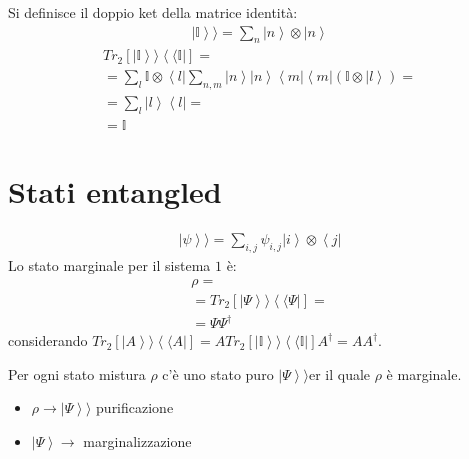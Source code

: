 Si definisce il doppio ket della matrice identità:
\begin{equation}\begin{split}
\left |\mathbb{I} \right\rangle\rangle=\sum_{n}{\left |n \right\rangle\otimes \left |n \right\rangle}
\end{split}\end{equation}
\begin{equation}\begin{split}
Tr_2\left[\left |\mathbb{I} \right\rangle\rangle\left\langle \langle \mathbb{I}\right |\right]=\\
=\sum_l{\mathbb{I}\otimes \left\langle l\right |}\sum_{n,m}{\left |n \right\rangle\left |n \right\rangle\left\langle m\right |\left\langle m\right |\left(\mathbb{I} \otimes \left |l \right\rangle\right)}=\\
=\sum_l{\left |l \right\rangle\left\langle l\right |}=\\
=\mathbb{I}
\end{split}\end{equation}

\section{Stati entangled} %
\begin{equation}\begin{split}
\left |\psi  \right\rangle\rangle=\sum_{i,j}{\psi _{i,j}\left |i \right\rangle\otimes \left\langle j\right |}
\end{split}\end{equation}
Lo stato marginale per il sistema $1$ è:
\begin{equation}\begin{split}
\rho=\\
=Tr_2\left[\left |\Psi  \right\rangle\rangle\left\langle \langle \Psi \right |\right]=\\
=\Psi \Psi ^{\dag}
\end{split}\end{equation}
considerando $Tr_2\left[\left |A \right\rangle\rangle\left\langle \langle A \right |\right]=ATr_2\left[\left |\mathbb{I} \right\rangle\rangle \left\langle \langle \mathbb{I}\right |\right]A^{\dag}=AA^{\dag}$.

Per ogni stato mistura $\rho$ c'è uno stato puro $\left |\Psi \right\rangle\rangle$er il quale $\rho$ è marginale.

\begin{itemize}
\item $\rho \rightarrow \left |\Psi \right\rangle\rangle$ purificazione
\item $\left |\Psi \right\rangle \rightarrow $ marginalizzazione
\end{itemize}

